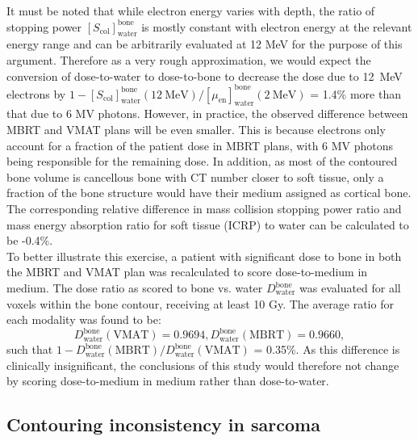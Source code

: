 \documentclass[aapm,graphicx,superscriptaddress]{revtex4-1}
\begin{document}
It must be noted that while electron energy varies with depth, the ratio of stopping power $[S_\text{col}]^\text{bone}_\text{water}$ is mostly constant with electron energy at the relevant energy range and can be arbitrarily evaluated at 12 MeV for the purpose of this argument. Therefore as a very rough approximation, we would expect the conversion of dose-to-water to dose-to-bone to decrease the dose due to 12~MeV electrons by $1-[S_\text{col}]^\text{bone}_\text{water}(12~\text{MeV})/[\mu_\text{en}]^\text{bone}_\text{water}(2~\text{MeV})$ = 1.4\% more than that due to 6 MV photons. However, in practice, the observed difference between MBRT and VMAT plans will be even smaller. This is because electrons only account for a fraction of the patient dose in MBRT plans, with 6 MV photons being responsible for the remaining dose. In addition, as most of the contoured bone volume is cancellous bone with CT number closer to soft tissue, only a fraction of the bone structure would have their medium assigned as cortical bone. The corresponding relative difference in mass collision stopping power ratio and mass energy absorption ratio for soft tissue (ICRP) to water can be calculated to be -0.4\%.\\

To better illustrate this exercise, a patient with significant dose to bone in both the MBRT and VMAT plan was recalculated to score dose-to-medium in medium. The dose ratio as scored to bone vs. water $D^\text{bone}_\text{water}$ was evaluated for all voxels within the bone contour, receiving at least 10 Gy. The average ratio for each modality was found to be:
\begin{equation}
    D^\text{bone}_\text{water}(\text{VMAT}) = 0.9694, D^\text{bone}_\text{water}(\text{MBRT}) = 0.9660,
\end{equation}
such that $1-D^\text{bone}_\text{water}(\text{MBRT})/D^\text{bone}_\text{water}(\text{VMAT})$ = 0.35\%. As this difference is clinically insignificant, the conclusions of this study would therefore not change by scoring dose-to-medium in medium rather than dose-to-water.

\subsection{Contouring inconsistency in sarcoma}
\end{document}
